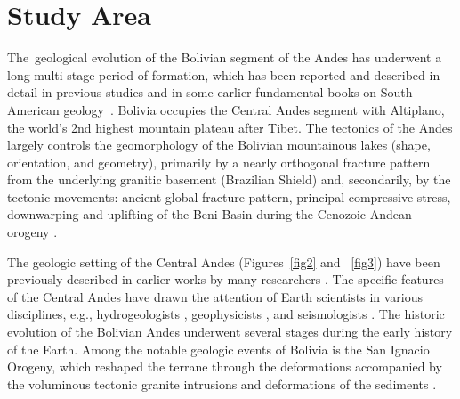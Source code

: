 \documentclass[data,article,accept,pdftex,moreauthors]{Definitions/mdpi}
\begin{document}
\section{Study Area}


 \mbox{The geological} evolution of the Bolivian {segment of} the Andes has underwent a long multi-stage period of formation, which has been reported and described in detail in previous studies \cite{Andersonetal,Arguedas} and in some earlier fundamental books on South American \mbox{geology~\cite{Forbes,Suarez,Ahfeld}}. Bolivia occupies the Central Andes segment with Altiplano, the world's 2nd highest mountain plateau after Tibet. The tectonics of the Andes largely {controls} the geomorphology of the Bolivian mountainous lakes (shape, orientation, and geometry), primarily by a nearly orthogonal fracture pattern from the underlying granitic basement (Brazilian Shield) and, secondarily, by the tectonic movements: ancient global fracture pattern, principal compressive stress, downwarping and uplifting of the Beni Basin during the Cenozoic Andean orogeny \cite{Allenby1988}. 

The geologic setting of {the} Central Andes (Figures~\ref{fig2} and ~\ref{fig3}) have been {previously} described in earlier works by many researchers \cite{Ramos,Fernandez,Funning}. {The specific features of the Central Andes} have drawn the attention of Earth scientists in various disciplines, e.g.{, }hydrogeologists \cite{Lima2021a,Lima2021b}, geophysicists \cite{Aviles,Borsa}, and seismologists \cite{Dorbath,Dahm}. The historic evolution of the Bolivian Andes underwent several stages during the early history of the Earth. Among the notable geologic events of Bolivia {is} the San Ignacio Orogeny, which reshaped the terrane through {the} deformations accompanied by {the} voluminous tectonic granite {intrusions and deformations} of the sediments \cite{Boger}. 
\end{document}
